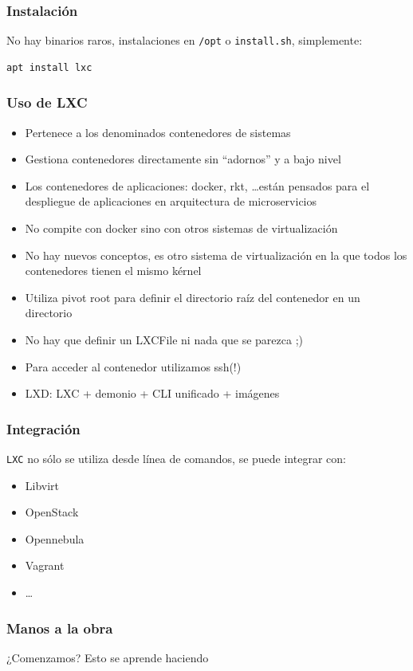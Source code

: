 \documentclass[aspectratio=169]{beamer}
\begin{document}
\begin{frame}[fragile]
  \frametitle{Instalación}
  No hay binarios raros, instalaciones en \texttt{/opt} o \texttt{install.sh}, simplemente:
\begin{verbatim}
apt install lxc
\end{verbatim}
\end{frame}

\begin{frame}
  \frametitle{Uso de LXC}
  \begin{itemize}
  \item Pertenece a los denominados contenedores de sistemas
  \item Gestiona contenedores directamente sin ``adornos'' y a bajo nivel
  \item Los contenedores de aplicaciones: docker, rkt, \ldots están pensados para el despliegue de aplicaciones en arquitectura de microservicios
  \item No compite con docker sino con otros sistemas de virtualización
  \item No hay nuevos conceptos, es otro sistema de virtualización en la que todos los contenedores tienen el mismo kérnel
  \item Utiliza pivot root para definir el directorio raíz del contenedor en un directorio
  \item No hay que definir un LXCFile ni nada que se parezca ;)
  \item Para acceder al contenedor utilizamos ssh(!)
  \item LXD: LXC + demonio + CLI unificado + imágenes
  \end{itemize}
\end{frame}

\begin{frame}
  \frametitle{Integración}
  \texttt{LXC} no sólo se utiliza desde línea de comandos, se puede integrar con:
  \begin{itemize}
  \item Libvirt
  \item OpenStack
  \item Opennebula
  \item Vagrant
  \item \ldots
  \end{itemize}
\end{frame}

\begin{frame}
  \frametitle{Manos a la obra}
  ¿Comenzamos? Esto se aprende haciendo
\end{frame}
\end{document}
